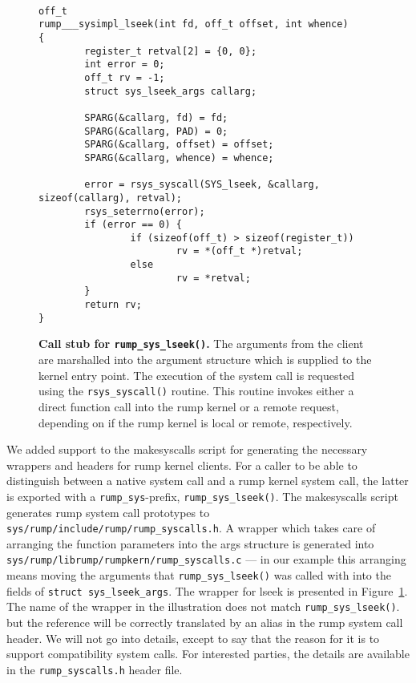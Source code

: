 \begin{figure}[t]
{\tt \scriptsize  
\begin{verbatim}
off_t
rump___sysimpl_lseek(int fd, off_t offset, int whence)
{
        register_t retval[2] = {0, 0};
        int error = 0;
        off_t rv = -1;
        struct sys_lseek_args callarg;

        SPARG(&callarg, fd) = fd;
        SPARG(&callarg, PAD) = 0;
        SPARG(&callarg, offset) = offset;
        SPARG(&callarg, whence) = whence;

        error = rsys_syscall(SYS_lseek, &callarg, sizeof(callarg), retval);
        rsys_seterrno(error);
        if (error == 0) {
                if (sizeof(off_t) > sizeof(register_t))
                        rv = *(off_t *)retval;
                else
                        rv = *retval;
        }
        return rv;
}
\end{verbatim}}
\caption[Call stub for \texttt{rump\_sys\_lseek()}]{
\textbf{Call stub for \texttt{rump\_sys\_lseek()}.}
The arguments from the client are marshalled into the argument structure
which is supplied to the kernel entry point.  The execution of the system
call is requested using the \texttt{rsys\_syscall()} routine.  This routine
invokes either a direct function call into the rump kernel or a remote request,
depending on if the rump kernel is local or remote, respectively.
}
\label{fig:rumpsyslseek}
\end{figure}

We added support to the makesyscalls script for generating the necessary
wrappers and headers for rump kernel clients.  For a caller to be
able to distinguish between a native system call and a rump kernel
system call, the latter is exported with a \verb+rump_sys+-prefix, \eg
\verb+rump_sys_lseek()+.  The makesyscalls script generates
rump system call prototypes to
\verb+sys/rump/include/rump/rump_syscalls.h+.  A wrapper which
takes care of arranging the function parameters into the args
structure is generated into
\verb+sys/rump/librump/rumpkern/rump_syscalls.c+ --- in our example
this arranging means moving the arguments that \verb+rump_sys_lseek()+ was
called with into the fields of \verb+struct sys_lseek_args+.  The
wrapper for lseek is presented in Figure~\ref{fig:rumpsyslseek}.
The name of the wrapper in the illustration does not match
\verb+rump_sys_lseek()+.
but the reference will be correctly translated by an alias
in the rump system call header.  We will not go into details,
except to say that the reason for it is to support compatibility
system calls.  For interested parties, the details are available in
the \verb+rump_syscalls.h+ header file.


